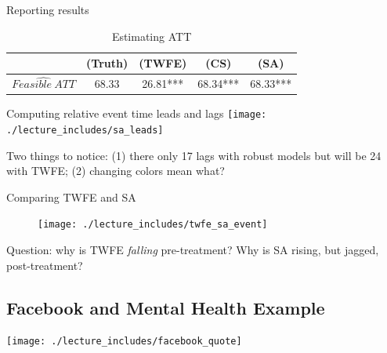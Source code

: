 \documentclass{beamer}
\begin{document}
\begin{frame}{Reporting results}
\begin{table}[htbp]\centering
\small
\caption{Estimating ATT}
\begin{center}
\begin{tabular}{l*{4}{c}}
\hline
\multicolumn{1}{l}{\textbf{}}&
\multicolumn{1}{c}{\textbf{(Truth)}}&
\multicolumn{1}{c}{\textbf{(TWFE)}}&
\multicolumn{1}{c}{\textbf{(CS)}}&
\multicolumn{1}{c}{\textbf{(SA)}}\\
\hline
$\widehat{Feasible\ ATT}$  & 68.33    & 26.81*** & 68.34*** & 68.33***\\
\hline
\end{tabular}
\end{center}
\end{table}

\end{frame}

\begin{frame}{Computing relative event time leads and lags }
             \texttt{[image: ./lecture\_includes/sa\_leads]}

Two things to notice: (1) there only 17 lags with robust models but will be 24 with TWFE; (2) changing colors mean what?

\end{frame}

\begin{frame}{Comparing TWFE and SA }

\begin{figure}
\begin{center}
             \texttt{[image: ./lecture\_includes/twfe\_sa\_event]}
\end{center}
\end{figure}

Question: why is TWFE \emph{falling} pre-treatment?  Why is SA rising, but jagged, post-treatment?

\end{frame}



\subsection{Facebook and Mental Health Example}

\begin{frame}
\begin{center}
\texttt{[image: ./lecture\_includes/facebook\_quote]}
\end{center}
\end{frame}
\end{document}
